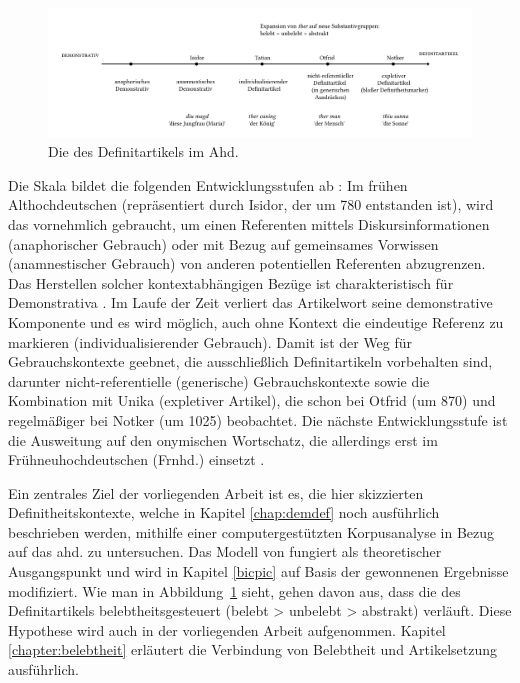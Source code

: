 \begin{figure}
\includegraphics[width=\textwidth]{images/schmuckszczep.pdf}
\caption {Die  des Definitartikels im Ahd. \parencite[102]{Schmuck2014}\label{abb:schmuckszczep}}
\end{figure}
 
Die Skala bildet die folgenden Entwicklungsstufen ab \parencite[vgl. auch][69--78]{Szczepaniak2011a}: Im frühen Althochdeutschen (repräsentiert durch Isidor, der um 780 entstanden ist), wird das  vornehmlich gebraucht, um einen Referenten mittels Diskursinformationen (anaphorischer Gebrauch)  oder mit Bezug auf gemeinsames Vorwissen (anamnestischer Gebrauch) von anderen potentiellen Referenten abzugrenzen. Das Herstellen solcher kontextabhängigen Bezüge ist charakteristisch für Demonstrativa  \parencite[85]{Himmelmann1997}. Im Laufe der Zeit verliert das Artikelwort  seine demonstrative Komponente und es wird möglich, auch ohne Kontext die eindeutige Referenz zu markieren (individualisierender Gebrauch). Damit ist der Weg für Gebrauchskontexte geebnet, die ausschließlich Definitartikeln vorbehalten sind, darunter nicht-referentielle (generische) Gebrauchskontexte  sowie die Kombination mit Unika  (expletiver Artikel),  die \textcite{Oubouzar1989,Oubouzar1992} schon bei Otfrid (um 870) und regelmäßiger bei Notker (um 1025) beobachtet. Die nächste Entwicklungsstufe ist die Ausweitung auf den onymischen Wortschatz,  die allerdings erst im Frühneuhochdeutschen (Frnhd.) einsetzt \parencite[s. ausführlich][]{Schmuck2014}. 

Ein zentrales Ziel der vorliegenden Arbeit ist es, die hier skizzierten Definitheitskontexte,  welche in Kapitel \ref{chap:demdef} noch ausführlich beschrieben werden, mithilfe einer computergestützten Korpusanalyse in Bezug auf das ahd.  zu untersuchen. Das Modell von \textcite{Schmuck2014} fungiert als theoretischer Ausgangspunkt und wird in Kapitel \ref{bicpic} auf Basis der gewonnenen Ergebnisse modifiziert. Wie man in Abbildung~\ref{abb:schmuckszczep} sieht, gehen \textcite{Schmuck2014} davon aus, dass die  des Definitartikels belebtheitsgesteuert  (belebt > unbelebt > abstrakt) verläuft. Diese Hypothese wird auch in der vorliegenden Arbeit aufgenommen. Kapitel \ref{chapter:belebtheit} erläutert die Verbindung von Belebtheit  und Artikelsetzung ausführlich. 

